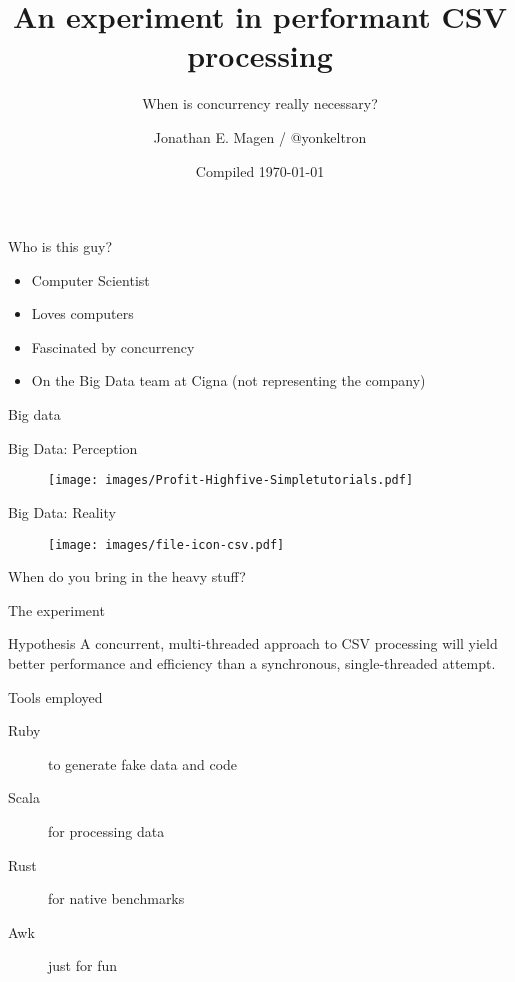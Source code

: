 \documentclass[aspectratio=169]{beamer}
\title{An experiment in performant CSV processing}
\subtitle{When is concurrency really necessary?}
\author{Jonathan E. Magen / \faicon{twitter} @yonkeltron}
\date{Compiled \today}
\newcommand{\megatext}[1]{
  \begin{center}
    \Huge
    #1
  \end{center}
}
\begin{document}
\frame{\titlepage}

\begin{frame}{Who is this guy?}
  \begin{itemize}
  \item Computer Scientist
  \item Loves computers
  \item Fascinated by concurrency
  \item On the Big Data team at Cigna (not representing the company)
  \end{itemize}
\end{frame}


\begin{frame}
  \megatext{Big data}
\end{frame}

\begin{frame}{Big Data: Perception}
  \begin{figure}
    \texttt{[image: images/Profit-Highfive-Simpletutorials.pdf]}
  \end{figure}
\end{frame}

\begin{frame}{Big Data: Reality}
  \begin{figure}
    \texttt{[image: images/file-icon-csv.pdf]}
  \end{figure}
\end{frame}

\begin{frame}
  \megatext{When do you bring in the heavy stuff?}
\end{frame}

\begin{frame}{The experiment}
  \begin{block}{Hypothesis}
    A concurrent, multi-threaded approach to CSV processing will yield better performance and efficiency than a synchronous, single-threaded attempt.
  \end{block}

  \begin{block}{Tools employed}
    \begin{description}
    \item[Ruby] to generate fake data and code
    \item[Scala] for processing data
    \item[Rust] for native benchmarks
    \item[Awk] just for fun
    \end{description}
  \end{block}
\end{frame}
\end{document}
